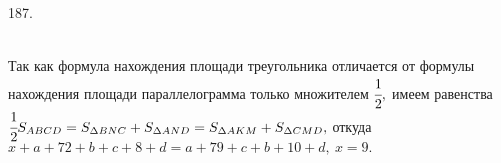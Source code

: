 187. \begin{figure}[ht!]
\end{figure}\\
Так как формула нахождения площади треугольника отличается от формулы нахождения площади параллелограмма только множителем $\cfrac{1}{2},$ имеем равенства
$\cfrac{1}{2}S_{ABCD}=S_{\Delta BNC}+S_{\Delta AND}=S_{\Delta AKM}+S_{\Delta CMD},$ откуда $x+a+72+b+c+8+d=a+79+c+b+10+d,\ x=9.$\\
